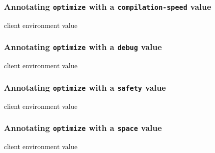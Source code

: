 
\subsubsection{Annotating \texttt{optimize} with a \texttt{compilation-speed} value}

{\footnotesize
{} {client environment value}
}


\subsubsection{Annotating \texttt{optimize} with a \texttt{debug} value}

{\footnotesize
{} {client environment value}
}


\subsubsection{Annotating \texttt{optimize} with a \texttt{safety} value}

{\footnotesize
{} {client environment value}
}


\subsubsection{Annotating \texttt{optimize} with a \texttt{space} value}

{\footnotesize
{} {client environment value}
}

